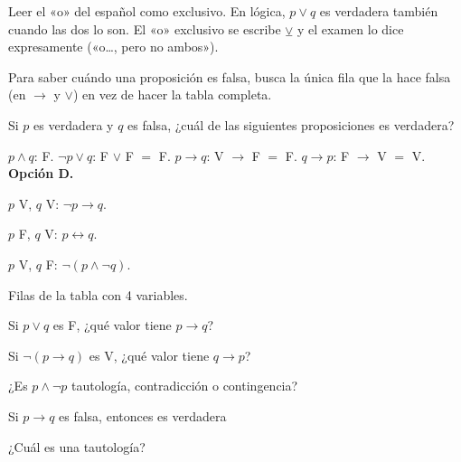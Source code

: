 \begin{trampa}
Leer el «o» del español como exclusivo. En lógica, $p \vee q$ es verdadera también cuando las dos lo son. El «o» exclusivo
se escribe $\veebar$ y el examen lo dice expresamente («o…, pero no ambos»).
\end{trampa}

\begin{atajo}
Para saber cuándo una proposición es falsa, busca la única fila que la hace falsa (en $\to$ y $\vee$) en vez de hacer la
tabla completa.
\end{atajo}

\begin{reto}
Si $p$ es verdadera y $q$ es falsa, ¿cuál de las siguientes proposiciones es verdadera?
\end{reto}

\begin{retoresuelto}
$p \wedge q$: F. $\neg p \vee q$: F $\vee$ F $=$ F. $p \to q$: V $\to$ F $=$ F. $q \to p$: F $\to$ V $=$ V.
\textbf{Opción D.}
\end{retoresuelto}

\taller
{}
\begin{ejercicios}[2]
\item $p$ V, $q$ V: $\neg p \to q$. 
\item $p$ F, $q$ V: $p \leftrightarrow q$. 
\item $p$ V, $q$ F: $\neg(p \wedge \neg q)$. 
\item Filas de la tabla con 4 variables. 
\end{ejercicios}
\begin{ejercicios}
\item Si $p \vee q$ es F, ¿qué valor tiene $p \to q$? 
\item Si $\neg(p \to q)$ es V, ¿qué valor tiene $q \to p$? 
\item ¿Es $p \wedge \neg p$ tautología, contradicción o contingencia? 
\end{ejercicios}
\begin{ejercicios}
\item Si $p \to q$ es falsa, entonces es verdadera
\item ¿Cuál es una tautología?
\end{ejercicios}


